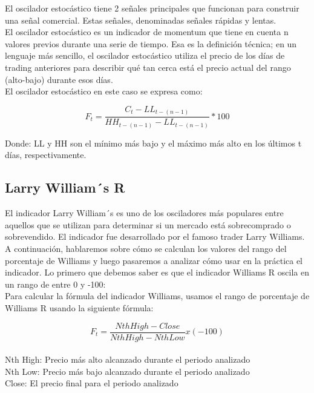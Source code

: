 \documentclass[letter, 12pt]{article}
\begin{document}
El oscilador estocástico tiene 2 señales principales que funcionan para construir una señal comercial. Estas señales, denominadas señales rápidas y lentas. \\

El oscilador estocástico es un indicador de momentum que tiene en cuenta n valores previos durante una serie de tiempo. Esa es la definición técnica; en un lenguaje más sencillo, el oscilador estocástico utiliza el precio de los días de trading anteriores para describir qué tan cerca está el precio actual del rango (alto-bajo) durante esos días.\\

El oscilador estocástico en este caso se expresa como:

$$F_{t}=\frac{C_{t}-LL_{t-(n-1)}}{HH_{t-(n-1)}-LL_{t-(n-1)}}*100 $$

Donde:
LL y HH son el mínimo más bajo y el máximo más alto en los últimos t días, respectivamente.\\

\subsection{Larry William´s R}

El indicador Larry William´s es uno de los osciladores más populares entre aquellos que se utilizan para determinar si un mercado está sobrecomprado o sobrevendido. El indicador fue desarrollado por el famoso trader Larry Williams.\\




A continuación, hablaremos sobre cómo se calculan los valores del rango del porcentaje de Williams y luego pasaremos a analizar cómo usar en la práctica el indicador. Lo primero que debemos saber es que el indicador Williams R oscila en un rango de entre 0 y -100: \\

Para calcular la fórmula del indicador Williams, usamos el rango de porcentaje de Williams R usando la siguiente fórmula:


$$F_{t}=\frac{Nth High - Close}{Nth High - Nth Low} x (-100) $$ \\
Nth High: Precio más alto alcanzado durante el periodo analizado \\
Nth Low: Precio más bajo alcanzado durante el periodo analizado \\
Close: El precio final para el periodo analizado \\
\end{document}
